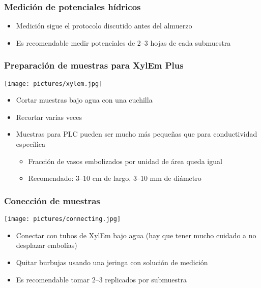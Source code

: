 \documentclass[usepdftitle=false]{beamer}
\newcommand{\rar}{$\rightarrow$}
\newcommand{\tw}{\textwidth}
\begin{document}
\begin{frame}
\frametitle{Medición de potenciales hídricos}
\begin{itemize}[<+->]
  \item Medición sigue el protocolo discutido antes del almuerzo
  \item Es recomendable medir potenciales de \alert<2>{2--3 hojas de cada submuestra}
\end{itemize}	
\end{frame}


\begin{frame}
\frametitle{Preparación de muestras para XylEm Plus}
\centering
\texttt{[image: pictures/xylem.jpg]}
\begin{itemize}[<+->]
  \item Cortar muestras bajo agua con una cuchilla
  \item Recortar varias veces
  \item Muestras para PLC pueden ser mucho más pequeñas que para conductividad específica 
  \begin{itemize}
    \item<3>[\rar] Fracción de vasos embolizados por unidad de área queda igual  
    \item<3| alert@3>[\rar] Recomendado: 3--10 cm de largo, 3--10 mm de diámetro
  \end{itemize}
\end{itemize}	
\end{frame}

\begin{frame}
\frametitle{Conección de muestras}
\begin{minipage}{0.38\tw}
 \centering
\texttt{[image: pictures/connecting.jpg]}
\end{minipage}
\begin{minipage}{0.6\tw}
\begin{itemize}[<+->]  
  \item \alert<1>{Conectar} con tubos de XylEm \alert<1>{bajo agua} (hay que tener mucho cuidado a no desplazar embolías)
  \item \alert<2>{Quitar burbujas} usando una jeringa con solución de medición
  \item Es recomendable tomar \alert<3>{2--3 replicados por submuestra}
\end{itemize}	
\end{minipage}
\end{frame}
\end{document}
